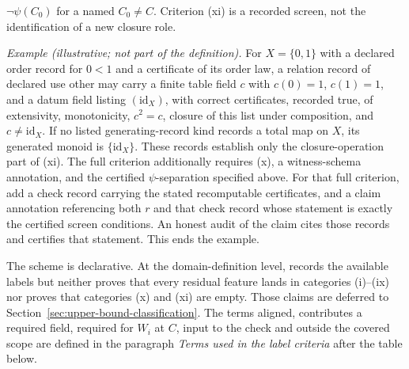\begin{definition}
\(\neg\psi(C_0)\) for a named \(C_0\ne C\). Criterion (xi) is a recorded screen, not the identification of a new closure
role.
\par\emph{Example (illustrative; not part of the definition).} For \(X=\{0,1\}\) with a declared order record for \(0<1\) and a certificate of its order law, a relation record of declared use other may
carry a finite table field \(c\) with \(c(0)=1\), \(c(1)=1\), and a datum field
listing \((\mathrm{id}_X)\), with correct certificates, recorded true, of extensivity,
monotonicity, \(c^2=c\), closure of this list under composition, and
\(c\ne\mathrm{id}_X\). If no listed generating-record kind records a total map
on \(X\), its generated monoid is \(\{\mathrm{id}_X\}\). These records establish only the closure-operation part of (xi). The full
criterion additionally requires (x), a witness-schema annotation, and the
certified \(\psi\)-separation specified above. For that full criterion, add a check record carrying the stated recomputable
certificates, and a claim annotation referencing both \(r\) and that check
record whose statement is exactly the certified screen conditions. An honest
audit of the claim cites those records and certifies that statement. This ends
the example.
\par The scheme is declarative. At the domain-definition level, \FATCD{} records
the available labels but neither proves that every residual feature lands in
categories (i)--(ix) nor proves that categories (x) and (xi) are empty. Those
claims are deferred to Section~\ref{sec:upper-bound-classification}.
The terms aligned, contributes a required field, required for \(W_i\) at \(C\),
input to the check and outside the covered scope are defined in the paragraph
\emph{Terms used in the label criteria} after the table below.
\end{definition}

